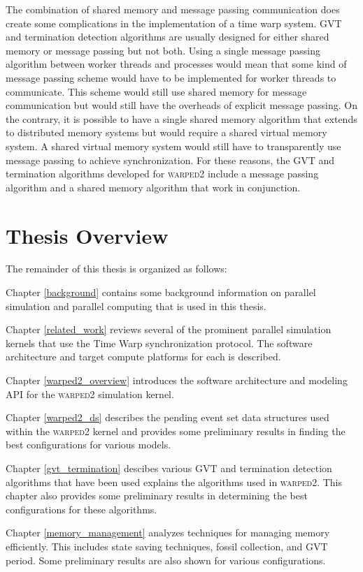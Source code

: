 \documentclass[11pt]{book}
\begin{document}
The combination of shared memory and message passing communication does create some
complications in the implementation of a time warp system. GVT and termination detection
algorithms are usually designed for either shared memory or message passing but not both.
Using a single message passing algorithm between worker threads and processes would mean
that some kind of message passing scheme would have to be implemented for worker threads
to communicate. This scheme would still use shared memory for message communication but
would still have the overheads of explicit message passing. On the contrary, it is possible
to have a single shared memory algorithm that extends to distributed memory systems but
would require a shared virtual memory system. A shared virtual memory system would still
have to transparently use message passing to achieve synchronization. For these reasons,
the GVT and termination algorithms developed for \textsc{warped2} include a message
passing algorithm and a shared memory algorithm that work in conjunction.

\section{Thesis Overview}

The remainder of this thesis is organized as follows:

Chapter \ref{background} contains some background information on parallel simulation and
parallel computing that is used in this thesis.

Chapter \ref{related_work} reviews several of the prominent parallel simulation kernels
that use the Time Warp synchronization protocol.  The software architecture and target
compute platforms for each is described.

Chapter \ref{warped2_overview} introduces the software architecture and modeling API for
the \textsc{warped2} simulation kernel.

Chapter \ref{warped2_ds} describes the pending event set data structures used within
the \textsc{warped2} kernel and provides some preliminary results in finding the best
configurations for various models.

Chapter \ref{gvt_termination} descibes various GVT and termination detection algorithms that
have been used explains the algorithms used in \textsc{warped2}. This chapter also provides
some preliminary results in determining the best configurations for these algorithms.

Chapter \ref{memory_management} analyzes techniques for managing memory efficiently. This
includes state saving techniques, fossil collection, and GVT period. Some preliminary results
are also shown for various configurations.
\end{document}
